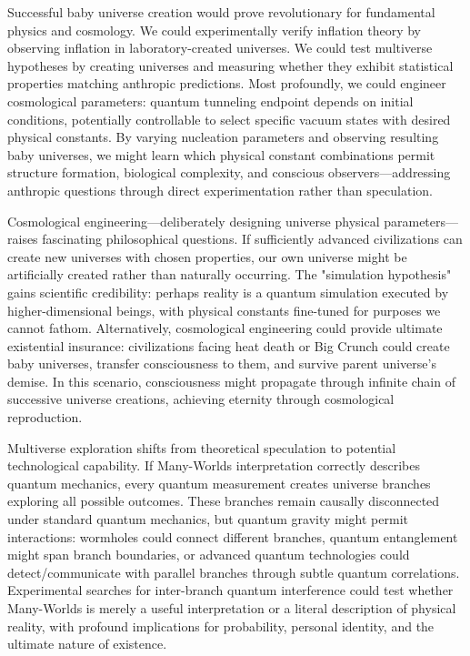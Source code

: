 \documentclass[11pt,a4paper,twoside]{article}
\begin{document}
Successful baby universe creation would prove revolutionary for fundamental physics and cosmology. We could experimentally verify inflation theory by observing inflation in laboratory-created universes. We could test multiverse hypotheses by creating universes and measuring whether they exhibit statistical properties matching anthropic predictions. Most profoundly, we could engineer cosmological parameters: quantum tunneling endpoint depends on initial conditions, potentially controllable to select specific vacuum states with desired physical constants. By varying nucleation parameters and observing resulting baby universes, we might learn which physical constant combinations permit structure formation, biological complexity, and conscious observers---addressing anthropic questions through direct experimentation rather than speculation.

Cosmological engineering---deliberately designing universe physical parameters---raises fascinating philosophical questions. If sufficiently advanced civilizations can create new universes with chosen properties, our own universe might be artificially created rather than naturally occurring. The "simulation hypothesis" gains scientific credibility: perhaps reality is a quantum simulation executed by higher-dimensional beings, with physical constants fine-tuned for purposes we cannot fathom. Alternatively, cosmological engineering could provide ultimate existential insurance: civilizations facing heat death or Big Crunch could create baby universes, transfer consciousness to them, and survive parent universe's demise. In this scenario, consciousness might propagate through infinite chain of successive universe creations, achieving eternity through cosmological reproduction.

Multiverse exploration shifts from theoretical speculation to potential technological capability. If Many-Worlds interpretation correctly describes quantum mechanics, every quantum measurement creates universe branches exploring all possible outcomes. These branches remain causally disconnected under standard quantum mechanics, but quantum gravity might permit interactions: wormholes could connect different branches, quantum entanglement might span branch boundaries, or advanced quantum technologies could detect/communicate with parallel branches through subtle quantum correlations. Experimental searches for inter-branch quantum interference could test whether Many-Worlds is merely a useful interpretation or a literal description of physical reality, with profound implications for probability, personal identity, and the ultimate nature of existence.
\end{document}
